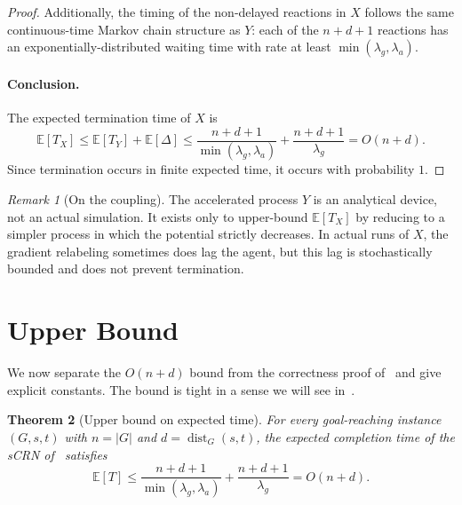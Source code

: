 \documentclass[11pt]{article}
\theoremstyle{plain}
\newtheorem{theorem}{Theorem}
\theoremstyle{definition}
\theoremstyle{remark}
\newtheorem{remark}[theorem]{Remark}
\DeclareMathOperator{\dist}{dist}
\begin{document}
\begin{proof}
Additionally, the timing of the non-delayed reactions in $X$ follows the same continuous-time Markov chain structure as $Y$: each of the $n + d + 1$ reactions has an exponentially-distributed waiting time with rate at least $\min(\lambda_g, \lambda_a)$.

\paragraph{Conclusion.} The expected termination time of $X$ is
\[
\mathbb{E}[T_X] \leq \mathbb{E}[T_Y] + \mathbb{E}[\Delta] \leq \frac{n + d + 1}{\min(\lambda_g, \lambda_a)} + \frac{n + d + 1}{\lambda_g} = O(n + d).
\]
Since termination occurs in finite expected time, it occurs with probability $1$.
\end{proof}

\begin{remark}[On the coupling]
The accelerated process $Y$ is an analytical device, not an actual simulation. It exists only to upper-bound $\mathbb{E}[T_X]$ by reducing to a simpler process in which the potential strictly decreases. In actual runs of $X$, the gradient relabeling sometimes does lag the agent, but this lag is stochastically bounded and does not prevent termination.
\end{remark}

\section{Upper Bound}
\label{sec:upper}

We now separate the $O(n + d)$ bound from the correctness proof of~ and give explicit constants. The bound is tight in a sense we will see in~.

\begin{theorem}[Upper bound on expected time]
\label{thm:upper}
For every goal-reaching instance $(G, s, t)$ with $n = |G|$ and $d = \dist_G(s, t)$, the expected completion time of the sCRN of~ satisfies
\[
\mathbb{E}[T] \leq \frac{n + d + 1}{\min(\lambda_g, \lambda_a)} + \frac{n + d + 1}{\lambda_g} = O(n + d).
\]
\end{theorem}
\end{document}

